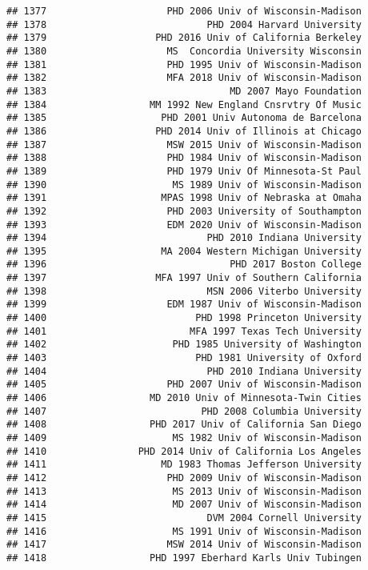 \documentclass[
]{article}
\begin{document}
\begin{verbatim}
## 1377                     PHD 2006 Univ of Wisconsin-Madison
## 1378                            PHD 2004 Harvard University
## 1379                   PHD 2016 Univ of California Berkeley
## 1380                     MS  Concordia University Wisconsin
## 1381                     PHD 1995 Univ of Wisconsin-Madison
## 1382                     MFA 2018 Univ of Wisconsin-Madison
## 1383                                MD 2007 Mayo Foundation
## 1384                  MM 1992 New England Cnsrvtry Of Music
## 1385                    PHD 2001 Univ Autonoma de Barcelona
## 1386                   PHD 2014 Univ of Illinois at Chicago
## 1387                     MSW 2015 Univ of Wisconsin-Madison
## 1388                     PHD 1984 Univ of Wisconsin-Madison
## 1389                     PHD 1979 Univ Of Minnesota-St Paul
## 1390                      MS 1989 Univ of Wisconsin-Madison
## 1391                    MPAS 1998 Univ of Nebraska at Omaha
## 1392                     PHD 2003 University of Southampton
## 1393                     EDM 2020 Univ of Wisconsin-Madison
## 1394                            PHD 2010 Indiana University
## 1395                    MA 2004 Western Michigan University
## 1396                                PHD 2017 Boston College
## 1397                   MFA 1997 Univ of Southern California
## 1398                            MSN 2006 Viterbo University
## 1399                     EDM 1987 Univ of Wisconsin-Madison
## 1400                          PHD 1998 Princeton University
## 1401                         MFA 1997 Texas Tech University
## 1402                      PHD 1985 University of Washington
## 1403                          PHD 1981 University of Oxford
## 1404                            PHD 2010 Indiana University
## 1405                     PHD 2007 Univ of Wisconsin-Madison
## 1406                  MD 2010 Univ of Minnesota-Twin Cities
## 1407                           PHD 2008 Columbia University
## 1408                  PHD 2017 Univ of California San Diego
## 1409                      MS 1982 Univ of Wisconsin-Madison
## 1410                PHD 2014 Univ of California Los Angeles
## 1411                    MD 1983 Thomas Jefferson University
## 1412                     PHD 2009 Univ of Wisconsin-Madison
## 1413                      MS 2013 Univ of Wisconsin-Madison
## 1414                      MD 2007 Univ of Wisconsin-Madison
## 1415                            DVM 2004 Cornell University
## 1416                      MS 1991 Univ of Wisconsin-Madison
## 1417                     MSW 2014 Univ of Wisconsin-Madison
## 1418                  PHD 1997 Eberhard Karls Univ Tubingen

\end{verbatim}
\end{document}
